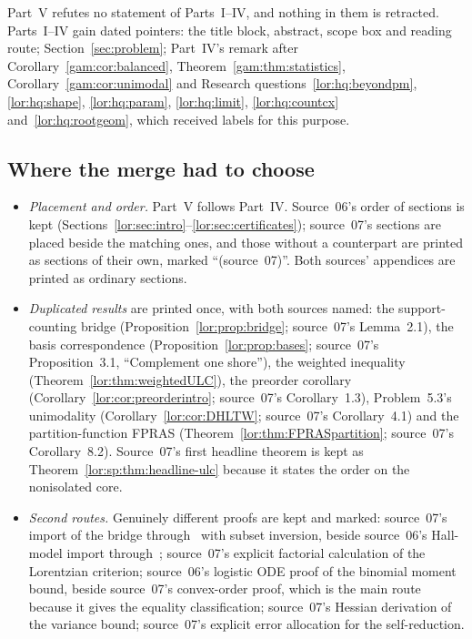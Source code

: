 \documentclass[11pt]{article}
\numberwithin{equation}{section}
\theoremstyle{definition}
\begin{document}
Part~V refutes no statement of Parts~I--IV, and nothing in them is
retracted. Parts~I--IV gain dated pointers: the title block, abstract,
scope box and reading route; Section~\ref{sec:problem}; Part~IV's remark
after Corollary~\ref{gam:cor:balanced}, Theorem~\ref{gam:thm:statistics},
Corollary~\ref{gam:cor:unimodal} and Research questions~\ref{lor:hq:beyondpm},
\ref{lor:hq:shape}, \ref{lor:hq:param}, \ref{lor:hq:limit},
\ref{lor:hq:countcx} and~\ref{lor:hq:rootgeom}, which received labels for
this purpose.

\subsection{Where the merge had to choose}
\label{lor:sec:merge}
\begin{itemize}[leftmargin=1.4em]
\item \emph{Placement and order.} Part~V follows Part~IV. Source~06's order
of sections is kept (Sections~\ref{lor:sec:intro}--\ref{lor:sec:certificates});
source~07's sections are placed beside the matching ones, and those without
a counterpart are printed as sections of their own, marked ``(source~07)''.
Both sources' appendices are printed as ordinary sections.
\item \emph{Duplicated results} are printed once, with both sources named:
the support-counting bridge (Proposition~\ref{lor:prop:bridge}; source~07's
Lemma~2.1), the basis correspondence (Proposition~\ref{lor:prop:bases};
source~07's Proposition~3.1, ``Complement one shore''), the weighted
inequality (Theorem~\ref{lor:thm:weightedULC}), the preorder corollary
(Corollary~\ref{lor:cor:preorderintro}; source~07's Corollary~1.3),
Problem~5.3's unimodality (Corollary~\ref{lor:cor:DHLTW}; source~07's
Corollary~4.1) and the partition-function FPRAS
(Theorem~\ref{lor:thm:FPRASpartition}; source~07's Corollary~8.2). Source~07's
first headline theorem is kept as Theorem~\ref{lor:sp:thm:headline-ulc}
because it states the order on the nonisolated core.
\item \emph{Second routes.} Genuinely different proofs are kept and marked:
source~07's import of the bridge through~\cite{DHLTW,DK} with subset
inversion, beside source~06's Hall-model import through~\cite{OT20,Oh};
source~07's explicit factorial calculation of the Lorentzian criterion;
source~06's logistic ODE proof of the binomial moment bound, beside
source~07's convex-order proof, which is the main route because it gives
the equality classification; source~07's Hessian derivation of the variance
bound; source~07's explicit error allocation for the self-reduction.

\end{itemize}
\end{document}
